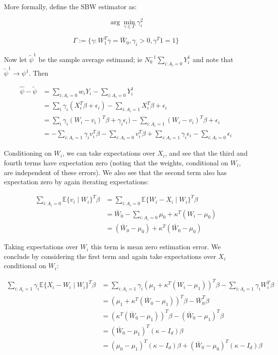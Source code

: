 \documentclass[12pt]{article}
\begin{document}
More formally, define the SBW estimator as:

$$
\arg\min_{\gamma \in \Gamma} \gamma_i^2
$$

$$
\Gamma := \{\gamma: W_1^T\gamma = \bar{W}_0, \gamma_i > 0, \gamma^T1 = 1\}
$$

Now let $\tilde{\psi}^1$ be the sample average estimand; ie $N_0^{-1}\sum_{i: A_i = 0}Y_i^1$ and note that $\tilde{\psi}^1 \to \psi^1$. Then

\begin{align*}
    \hat{\psi} - \tilde{\psi} &= \sum_{i: A_i = 0}w_iY_i - \sum_{i: A_i = 0}Y_i^1 \\
    &= \sum_i \gamma_i(X_i^T\beta + \epsilon_i) - \sum_{i: A_i = 1} X_i^T\beta + \epsilon_i \\
    &= \sum_i \gamma_i(W_i - v_i)^T\beta + \gamma_i\epsilon_i) - \sum_{i: A_i = 1} (W_i - v_i)^T\beta + \epsilon_i \\
    &= -\sum_{i: A_i = 1}\gamma_iv_i^T\beta - \sum_{i: A_i = 0} v_i^T\beta + \sum_{i: A_i = 1}\gamma_i\epsilon_i - \sum_{i: A_i = 0} \epsilon_i
\end{align*}

Conditioning on $W_i$, we can take expectations over $X_i$, and see that the third and fourth terms have expectation zero (noting that the weights, conditional on $W_i$, are independent of these errors). We also see that the second term also has expectation zero by again iterating expectations:

\begin{align*}
    \sum_{i: A_i = 0}\mathbb{E}\{v_i\mid W_i\}^T\beta &= \sum_{i: A_i = 0}\mathbb{E}\{W_i - X_i \mid W_i\}^T\beta \\
    &= \bar{W}_0 - \sum_{i: A_i = 0} \mu_0 + \kappa^T(W_i - \mu_0) \\
    &= (\bar{W}_0 - \mu_0) + \kappa^T(\bar{W}_0 - \mu_0)
\end{align*}

Taking expectations over $W_i$ this term is mean zero estimation error. We conclude by considering the first term and again take expectations over $X_i$ conditional on $W_i$: 

\begin{align*}
    \sum_{i: A_i = 1} \gamma_i\mathbb{E}\{X_i - W_i \mid W_i\}^T\beta &= \sum_{i: A_i = 1} \gamma_i (\mu_1 + \kappa^T(W_i - \mu_1))^T\beta - \sum_{i: A_i = 1}\gamma_i W_i^T\beta \\
    &= (\mu_1 + \kappa^T(\bar{W}_0 - \mu_1))^T\beta - \bar{W}_0^T\beta \\
    &= (\kappa^T(\bar{W}_0 - \mu_1))^T\beta - (\bar{W}_0 - \mu_1)^T\beta  \\
    &= (\bar{W}_0 - \mu_1)^T(\kappa - I_d)\beta \\
    &= (\mu_0 - \mu_1)^T(\kappa - I_d)\beta + (\bar{W}_0 - \mu_0)^T(\kappa - I_d)\beta \\
\end{align*}
\end{document}
